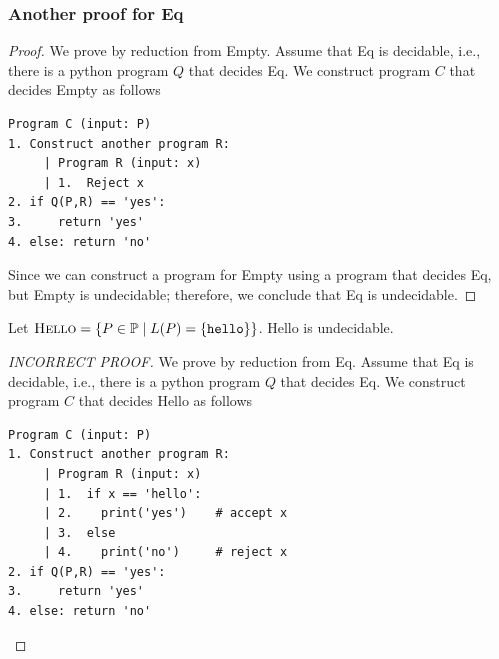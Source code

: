 \begin{frame}[fragile=true]
  \frametitle{Another proof for {\sc Eq}}
  
  \begin{proof}
    {\small
      
    We prove by reduction from {\sc Empty}.  Assume that {\sc Eq} is
    decidable, i.e., there is a python program $Q$ that decides {\sc
      Eq}.  We construct program $C$ that decides {\sc Empty} as follows

    {\footnotesize
\begin{verbatim}
Program C (input: P)
1. Construct another program R:
     | Program R (input: x)
     | 1.  Reject x
2. if Q(P,R) == 'yes':
3.     return 'yes'
4. else: return 'no'
\end{verbatim}
    }

    Since we can construct a program for {\sc Empty} using a program
    that decides {\sc Eq}, but {\sc Empty} is undecidable; therefore,
    we conclude that {\sc Eq} is undecidable.
    }
  \end{proof}
\end{frame}

\begin{frame}[fragile=true]
  \begin{lemma}
    Let $\textsc{Hello} = \{ P\in{\mathbb P} \;|\;
    L(P)=\{\texttt{hello}\}\}$.
    {\sc Hello} is undecidable.
  \end{lemma}
  \begin{proof}[INCORRECT PROOF]
      We prove by reduction from {\sc Eq}.  Assume that {\sc Eq} is
      decidable, i.e., there is a python program $Q$ that decides {\sc
        Eq}.  We construct program $C$ that decides {\sc Hello} as
      follows

      {\footnotesize
\begin{verbatim}
Program C (input: P)
1. Construct another program R:
     | Program R (input: x)
     | 1.  if x == 'hello':
     | 2.    print('yes')    # accept x
     | 3.  else
     | 4.    print('no')     # reject x
2. if Q(P,R) == 'yes':
3.     return 'yes'
4. else: return 'no'
\end{verbatim}
      }
  \end{proof}
\end{frame}


